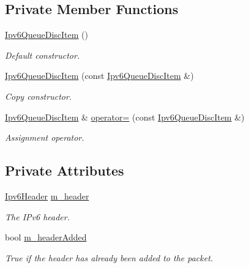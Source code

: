 \subsection*{Private Member Functions}
\begin{DoxyCompactItemize}
\item 
\hyperlink{classns3_1_1Ipv6QueueDiscItem_a41beee326ebcf941f8f1256d84762ae3}{Ipv6\+Queue\+Disc\+Item} ()
\begin{DoxyCompactList}\small\item\em Default constructor. \end{DoxyCompactList}\item 
\hyperlink{classns3_1_1Ipv6QueueDiscItem_ac2b0c25b849d8b0e9b5336c72432b71b}{Ipv6\+Queue\+Disc\+Item} (const \hyperlink{classns3_1_1Ipv6QueueDiscItem}{Ipv6\+Queue\+Disc\+Item} \&)
\begin{DoxyCompactList}\small\item\em Copy constructor. \end{DoxyCompactList}\item 
\hyperlink{classns3_1_1Ipv6QueueDiscItem}{Ipv6\+Queue\+Disc\+Item} \& \hyperlink{classns3_1_1Ipv6QueueDiscItem_a30310605d25b39a6b2d669b2373f74a5}{operator=} (const \hyperlink{classns3_1_1Ipv6QueueDiscItem}{Ipv6\+Queue\+Disc\+Item} \&)
\begin{DoxyCompactList}\small\item\em Assignment operator. \end{DoxyCompactList}\end{DoxyCompactItemize}
\subsection*{Private Attributes}
\begin{DoxyCompactItemize}
\item 
\hyperlink{classns3_1_1Ipv6Header}{Ipv6\+Header} \hyperlink{classns3_1_1Ipv6QueueDiscItem_a6a7616c84b6f71b31f1933a05d28c833}{m\+\_\+header}
\begin{DoxyCompactList}\small\item\em The I\+Pv6 header. \end{DoxyCompactList}\item 
bool \hyperlink{classns3_1_1Ipv6QueueDiscItem_af8aab7d08fadc62cf1f251909a6422ce}{m\+\_\+header\+Added}
\begin{DoxyCompactList}\small\item\em True if the header has already been added to the packet. \end{DoxyCompactList}\end{DoxyCompactItemize}

